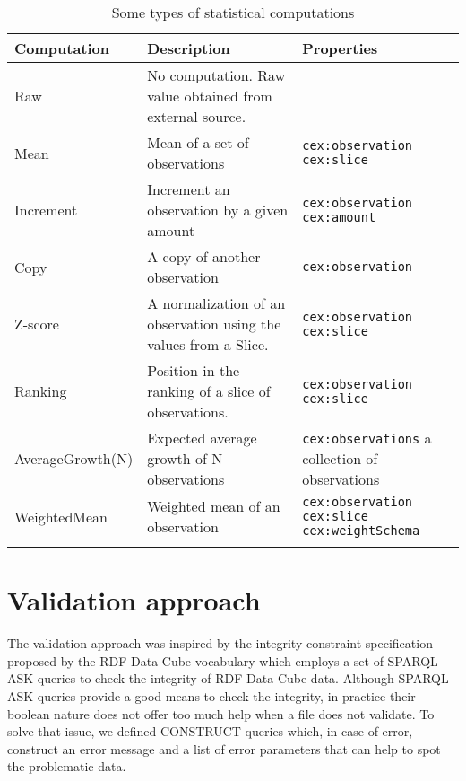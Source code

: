 \begin{table*}[tb]
\caption{Some types of statistical computations}
\label{table:computations}
\begin{center}
\begin{tabular}{ p{} p{} p{}}
\toprule
Computation & Description & Properties \\
\hline
Raw			& No computation. Raw value obtained from external source.
			&  \\
Mean	    & Mean of a set of observations 
			& \lstinline|cex:observation| \newline 
			  \lstinline|cex:slice| \\
Increment	& Increment an observation by a given amount 
			& \lstinline|cex:observation| \newline 
			  \lstinline|cex:amount|  \\
Copy		& A copy of another observation 
			& \lstinline|cex:observation| \\
Z-score		& A normalization of an observation using the values from a Slice. 
			& \lstinline|cex:observation| \newline 
			  \lstinline|cex:slice| \\
Ranking		& Position in the ranking of a slice of observations. 
			& \lstinline|cex:observation| \newline 
			  \lstinline|cex:slice| \\
AverageGrowth(N)	& Expected average growth of N observations
			& \lstinline|cex:observations| a collection of observations \\
WeightedMean & Weighted mean of an observation
			& \lstinline|cex:observation| \newline
			  \lstinline|cex:slice|       \newline
			  \lstinline|cex:weightSchema| \\
\bottomrule\\
\end{tabular}
\end{center}
\end{table*}

\section{Validation approach}

The validation approach was inspired by the integrity constraint specification
 proposed by the RDF Data Cube vocabulary which employs a set of SPARQL ASK queries
 to check the integrity of RDF Data Cube data. 
 Although SPARQL ASK queries provide a good means to check the integrity, in practice
  their boolean nature does not offer too much help when a file does not validate.
 To solve that issue, we defined CONSTRUCT queries which, in case of error, 
  construct an error message and a list of error parameters that can help to spot the
  problematic data.

